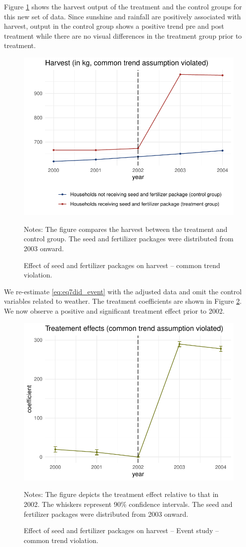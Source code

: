 Figure \ref{fig:did_d} shows the harvest output of the treatment and the control groups for this new set of data. 
Since sunshine and rainfall are positively associated with harvest, output in the control group shows a positive trend pre and post treatment while there are no visual differences in the treatment group prior to treatment.

\begin{figure}[htb]
	\begin{center}
		\includegraphics[width=0.55\linewidth]{../figures/part5d.pdf}
	\end{center}
	\caption{Effect of seed and fertilizer packages on harvest -- common trend violation.}
	\label{fig:did_d}	{\footnotesize Notes: The figure compares the harvest between the treatment and control group. The seed and fertilizer packages were distributed from 2003 onward.}
\end{figure}

We re-estimate \eqref{eq:eq7did_event} with the adjusted data and omit the control variables related to weather. The treatment coefficients are shown in Figure \ref{fig:did_d2}. We now observe a positive and significant treatment effect prior to 2002.


\begin{figure}[htb]
	\begin{center}
		\includegraphics[width=0.55\linewidth]{../figures/part5d2.pdf}
	\end{center}
	\caption{Effect of seed and fertilizer packages on harvest -- Event study -- common trend violation.}
	\label{fig:did_d2}	{\footnotesize Notes: The figure depicts the treatment effect relative to that in 2002. The whiskers represent 90\% confidence intervals. The seed and fertilizer packages were distributed from 2003 onward.}
\end{figure}



\clearpage





\clearpage



